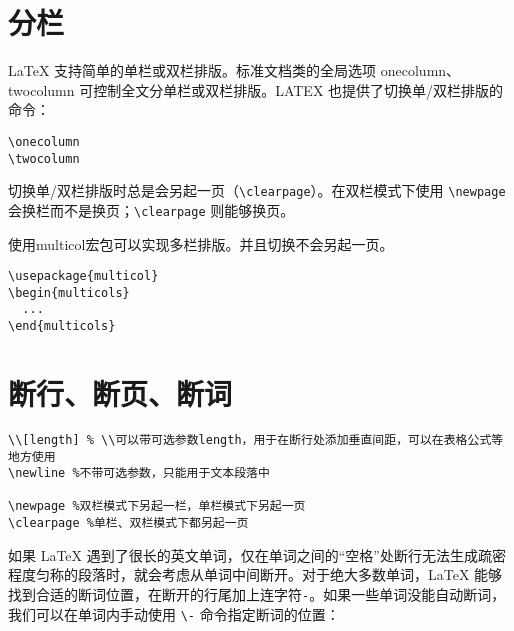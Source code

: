 \begin{codeshow}
  \\
  \\
  \\
  \\
  \\
\end{codeshow}

\section{分栏}\label{sec:columns}

\LaTeX{} 支持简单的单栏或双栏排版。标准文档类的全局选项 onecolumn、twocolumn 可控制全文分单栏或双栏排版。LATEX 也提供了切换单/双栏排版的命令：

\begin{lstlisting}
\onecolumn
\twocolumn
\end{lstlisting}

切换单/双栏排版时总是会另起一页（\lstinline{\clearpage}）。在双栏模式下使用 \lstinline{\newpage} 会换栏而不是换页；\lstinline{\clearpage} 则能够换页。

使用multicol宏包可以实现多栏排版。并且切换不会另起一页。

\begin{lstlisting}
\usepackage{multicol}
\begin{multicols}{2}
  ...
\end{multicols}
\end{lstlisting}

\section{断行、断页、断词}\label{sec:break}

\begin{lstlisting}
\\[length] % \\可以带可选参数length，用于在断行处添加垂直间距，可以在表格公式等地方使用
\newline %不带可选参数，只能用于文本段落中

\newpage %双栏模式下另起一栏，单栏模式下另起一页
\clearpage %单栏、双栏模式下都另起一页
\end{lstlisting}

如果 \LaTeX{} 遇到了很长的英文单词，仅在单词之间的“空格”处断行无法生成疏密程度匀称的段落时，就会考虑从单词中间断开。对于绝大多数单词，\LaTeX{} 能够找到合适的断词位置，在断开的行尾加上连字符\lstinline{-}。如果一些单词没能自动断词，我们可以在单词内手动使用 \lstinline{\-} 命令指定断词的位置：

